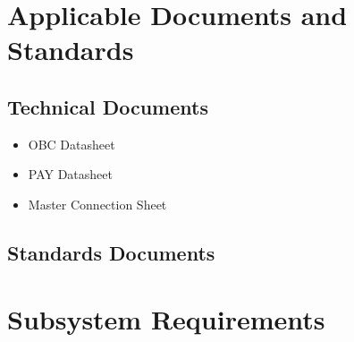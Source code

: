 \documentclass[12pt,a4paper]{article}
\begin{document}
\section{Applicable Documents and Standards}\label{sec:methods}
\subsection{Technical Documents}
\begin{itemize}
  \item OBC Datasheet
  \item PAY Datasheet
  \item Master Connection Sheet
\end{itemize}
\subsection{Standards Documents}

\section{Subsystem Requirements}\label{sec:requirements}
\end{document}
